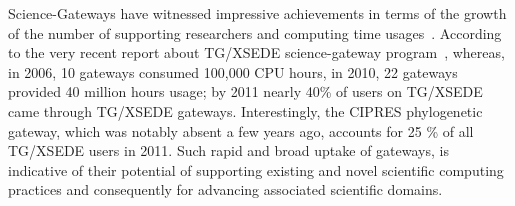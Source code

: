 \documentclass[]{svjour3}
\begin{document}

Science-Gateways have witnessed impressive achievements in terms of
the growth of the number of supporting researchers and computing time
usages~\cite{gce11-nancy}. According to the very recent report about
TG/XSEDE science-gateway program~\cite{gce11-nancy}, whereas, in 2006,
10 gateways consumed 100,000 CPU hours, in 2010, 22 gateways provided
40 million hours usage; by 2011 nearly 40\% of users on TG/XSEDE came
through TG/XSEDE gateways. Interestingly, the CIPRES phylogenetic
gateway, which was notably absent a few years ago, accounts for 25 \%
of all TG/XSEDE users in 2011. Such rapid and broad uptake of
gateways, is indicative of their potential of supporting existing and
novel scientific computing practices and consequently for advancing
associated scientific domains.
 
\end{document}
